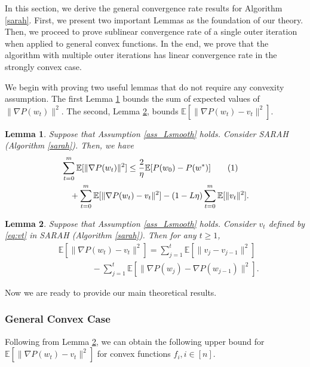 \documentclass{article}
\newtheorem{lem}{Lemma}
\newcommand\tagthis{\addtocounter{equation}{1}\tag{\theequation}}
\newcommand{\setn}{[n]}
\begin{document}
In this section, we derive the general convergence rate results for Algorithm \ref{sarah}. First, we present two important Lemmas as the foundation of our theory. Then, we proceed to prove sublinear convergence rate of a single outer iteration when applied to general convex functions. In the end, we prove that the algorithm with multiple outer iterations has linear convergence rate in the strongly convex case.

We begin with proving two useful lemmas that do not require any convexity assumption.
The first Lemma 
\ref{lem_main_derivation}
bounds the  sum of expected values of
$\|\nabla P(w_t)\|^2$.
The second, Lemma \ref{lem:var_diff_01},
bounds $\mathbb{E}[ \| \nabla P(w_{t}) - v_{t} \|^2 ]$. 

\begin{lem}\label{lem_main_derivation}
Suppose that Assumption \ref{ass_Lsmooth} holds. Consider SARAH (Algorithm \ref{sarah}). Then, we have 
\begin{align*}
& \sum_{t=0}^{m} \mathbb{E}[ \| \nabla P(w_{t})\|^2 ]  \leq \frac{2}{\eta} \mathbb{E}[ P(w_{0}) - P(w^{*})]
\tagthis \label{eq:001} 
\\&\quad+ \sum_{t=0}^{m} \mathbb{E}[ \| \nabla P(w_{t}) - v_{t} \|^2 ]  
 - ( 1 - L\eta ) \sum_{t=0}^{m} \mathbb{E} [ \| v_{t} \|^2 ].
\end{align*}
\end{lem}
\begin{lem}\label{lem:var_diff_01}
Suppose that Assumption \ref{ass_Lsmooth} holds. Consider $v_{t}$ defined by \eqref{eq:vt} in SARAH (Algorithm \ref{sarah}). Then for any $t\geq 1$, 
\begin{align*}
&\mathbb{E}[ \| \nabla P(w_{t}) - v_{t} \|^2 ] 
= \sum_{j = 1}^{t} \mathbb{E}[ \| v_{j} - v_{j-1} \|^2 ]  
 \\&\qquad\qquad
 - \sum_{j = 1}^{t} \mathbb{E}[ \| \nabla P(w_{j}) - \nabla P(w_{j-1}) \|^2 ]. 
\end{align*}
\end{lem}
Now we are ready to provide our main theoretical results. 

\subsubsection{General Convex Case}

Following from Lemma \ref{lem:var_diff_01}, we can obtain the following upper bound for $\mathbb{E}[ \| \nabla P(w_{t}) - v_{t} \|^2 ]$ for convex functions $f_i, i\in\setn$.
\end{document}
